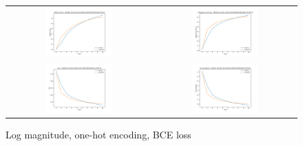 \begin{appendices}
        \begin{figure}[H]
            \centering
            \begin{tabular}{cc}
                \includegraphics[width=0.48\textwidth]{figures/training_plots/ModelC-(log_2D)-OneHot-BCE-ADAM_05-04-2019_20-28-23_AON-accuracy.pdf} & \includegraphics[width=0.48\textwidth]{figures/training_plots/ModelC-(log_2D)-OneHot-BCE-ADAM_05-04-2019_20-28-23_categorical-accuracy.pdf} \\
                \includegraphics[width=0.48\textwidth]{figures/training_plots/ModelC-(log_2D)-OneHot-BCE-ADAM_05-04-2019_20-28-23_loss.pdf} & \includegraphics[width=0.48\textwidth]{figures/training_plots/ModelC-(log_2D)-OneHot-BCE-ADAM_05-04-2019_20-28-23_KL-divergence.pdf}
            \end{tabular}
            \caption*{Log magnitude, one-hot encoding, BCE loss}
        \end{figure}
        

\end{appendices}
